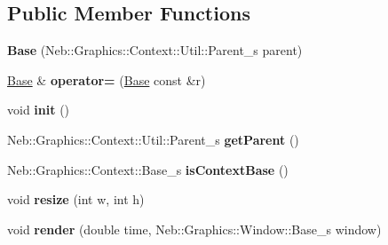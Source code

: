 \subsection*{\-Public \-Member \-Functions}
\begin{DoxyCompactItemize}
\item 
\hypertarget{classNeb_1_1Graphics_1_1Context_1_1Base_aa95ae98cc0e8e6d41ba4b5f6a6b5daa3}{{\bfseries \-Base} (\-Neb\-::\-Graphics\-::\-Context\-::\-Util\-::\-Parent\-\_\-s parent)}\label{classNeb_1_1Graphics_1_1Context_1_1Base_aa95ae98cc0e8e6d41ba4b5f6a6b5daa3}

\item 
\hypertarget{classNeb_1_1Graphics_1_1Context_1_1Base_a4d9cecda9a96de22a52c1a55e7cf6cc5}{\hyperlink{classNeb_1_1Graphics_1_1Context_1_1Base}{\-Base} \& {\bfseries operator=} (\hyperlink{classNeb_1_1Graphics_1_1Context_1_1Base}{\-Base} const \&r)}\label{classNeb_1_1Graphics_1_1Context_1_1Base_a4d9cecda9a96de22a52c1a55e7cf6cc5}

\item 
\hypertarget{classNeb_1_1Graphics_1_1Context_1_1Base_ae53015c10d1b49295bec4b5a232e00fb}{void {\bfseries init} ()}\label{classNeb_1_1Graphics_1_1Context_1_1Base_ae53015c10d1b49295bec4b5a232e00fb}

\item 
\hypertarget{classNeb_1_1Graphics_1_1Context_1_1Base_ac7029fa00d834d315d5a0e80160fd774}{\-Neb\-::\-Graphics\-::\-Context\-::\-Util\-::\-Parent\-\_\-s {\bfseries get\-Parent} ()}\label{classNeb_1_1Graphics_1_1Context_1_1Base_ac7029fa00d834d315d5a0e80160fd774}

\item 
\hypertarget{classNeb_1_1Graphics_1_1Context_1_1Base_a8a582a451f701094622efeebb3d13dec}{\-Neb\-::\-Graphics\-::\-Context\-::\-Base\-\_\-s {\bfseries is\-Context\-Base} ()}\label{classNeb_1_1Graphics_1_1Context_1_1Base_a8a582a451f701094622efeebb3d13dec}

\item 
\hypertarget{classNeb_1_1Graphics_1_1Context_1_1Base_a37f38f6067db83fcb771dba5df582215}{void {\bfseries resize} (int w, int h)}\label{classNeb_1_1Graphics_1_1Context_1_1Base_a37f38f6067db83fcb771dba5df582215}

\item 
\hypertarget{classNeb_1_1Graphics_1_1Context_1_1Base_a969de7cbec52d89e714dcc56fefacce4}{void {\bfseries render} (double time, \-Neb\-::\-Graphics\-::\-Window\-::\-Base\-\_\-s window)}\label{classNeb_1_1Graphics_1_1Context_1_1Base_a969de7cbec52d89e714dcc56fefacce4}

\end{DoxyCompactItemize}
